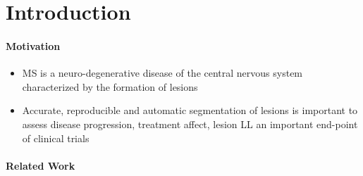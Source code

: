 \section{Introduction}

\paragraph{Motivation}
\begin{itemize}
  \item MS is a neuro-degenerative disease of the central nervous system
  characterized by the formation of lesions
  \item Accurate, reproducible and automatic segmentation of
  lesions is important to assess disease progression, treatment affect, lesion
  LL an important end-point of clinical trials
\end{itemize}

\paragraph{Related Work}

